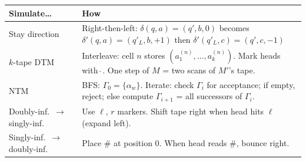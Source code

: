 \documentclass[11pt,a4paper]{article}
\begin{document}
\begin{center}
\renewcommand{\arraystretch}{1.3}
\begin{tabular}{lp{9cm}}
\toprule
\textbf{Simulate\ldots} & \textbf{How} \\
\midrule
Stay direction & Right-then-left: $\delta(q,a)=(q',b,0)$ becomes $\delta'(q,a)=(q'_L,b,+1)$ then $\delta'(q'_L,c)=(q',c,-1)$ \\
$k$-tape DTM & Interleave: cell $n$ stores $(a_1^{(n)}, \ldots, a_k^{(n)})$. Mark heads with $\hat{~}$. One step of $M$ = two scans of $M'$'s tape. \\
NTM & BFS: $\Gamma_0 = \{\alpha_w\}$. Iterate: check $\Gamma_i$ for acceptance; if empty, reject; else compute $\Gamma_{i+1}$ = all successors of $\Gamma_i$. \\
Doubly-inf.\ $\to$ singly-inf. & Use $\ell$, $r$ markers. Shift tape right when head hits $\ell$ (expand left). \\
Singly-inf.\ $\to$ doubly-inf. & Place $\#$ at position 0. When head reads $\#$, bounce right. \\
\bottomrule
\end{tabular}
\end{center}
\end{document}
